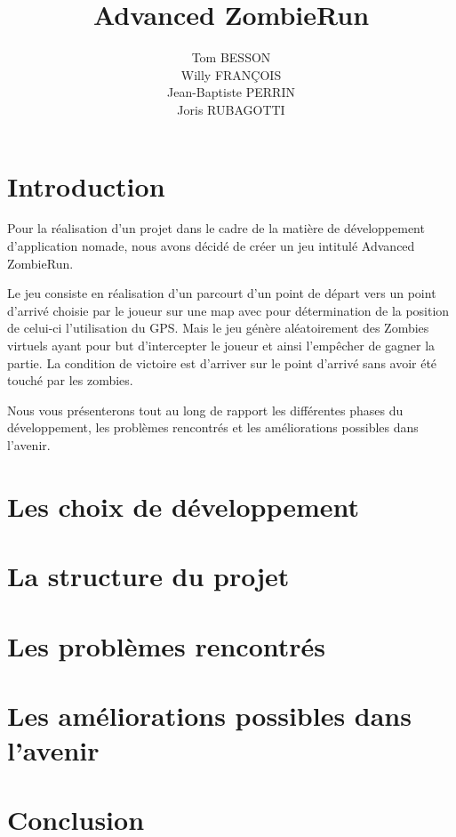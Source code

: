 \documentclass{article}
\title{Advanced ZombieRun}     %
\author{Tom BESSON\\ Willy FRANÇOIS\\ Jean-Baptiste PERRIN\\ Joris RUBAGOTTI}
\begin{document}
\maketitle


\newpage


\tableofcontents


\newpage


\section{Introduction}


Pour la réalisation d'un projet dans le cadre de la matière de développement d'application nomade, nous avons décidé de créer un jeu intitulé Advanced\\ ZombieRun.

Le jeu consiste en réalisation d'un parcourt d'un point de départ vers un point d'arrivé choisie par le joueur sur une map avec pour détermination de la position de celui-ci l'utilisation du GPS. Mais le jeu génère aléatoirement des Zombies virtuels ayant pour but d'intercepter le joueur et ainsi l'empêcher de gagner la partie.
La condition de victoire est d'arriver sur le point d'arrivé sans avoir été touché par les zombies.

Nous vous présenterons tout au long de rapport les différentes phases du développement, les problèmes rencontrés et les améliorations possibles dans l'avenir.


\section{Les choix de développement}


\section{La structure du projet}


\section{Les problèmes rencontrés}


\section{Les améliorations possibles dans l'avenir}


\section{Conclusion}

  
\end{document}
